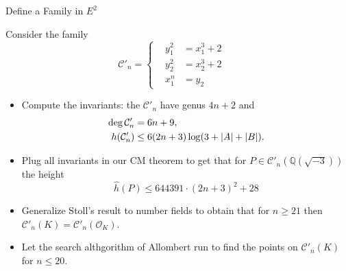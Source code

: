 \documentclass[handout]{beamer}
\newcommand{\qe}{\mathbb{Q}}
\newcommand{\Ci}{\mathcal{C}}
\begin{document}
\begin{frame}{Define a Family in $E^2$}
\begin{example}Consider the family \begin{equation*}
\mathcal{C}'_n=\begin{cases}
\,\,\,\,\,y_1^2&=x_1^3+2\,\,\,\,\,\,\,\,\\
\,\,\,\,\,y_2^2&=x_2^3+2\,\,\,\,\,\,\,\,\\
\,\,\,\,\,x_1^n&=y_2
\end{cases}
\end{equation*}
\end{example}

\pause

 \begin{itemize}
 \item Compute the invariants: 
 the  $\Ci'_n$ have genus $4n+2$ and 
\begin{align}
\begin{split}
 \notag  \deg \Ci'_n&= 6n+9,\\
 \notag  h(\Ci'_n)&\leq 6(2n+3)\log( 3+|A|+|B|).
\end{split}
\end{align}


 
 
\item Plug all invariants  in our CM theorem  to get  that for $P\in\Ci'_n(\qe(\sqrt{-3}))$ the height
$$\hat{h}(P)\leq 644391 \cdot (2n+3)^2+28
$$

\item Generalize Stoll's result to number fields to obtain that for $n\ge 21$ then $\Ci'_n(K)=\Ci'_n(\mathcal{O}_K)$.

\item Let  the search althgorithm of Allombert run to find the points on $\Ci'_n(K)$ for $n\le 20$.
\end{itemize}
\end{frame}
\end{document}
